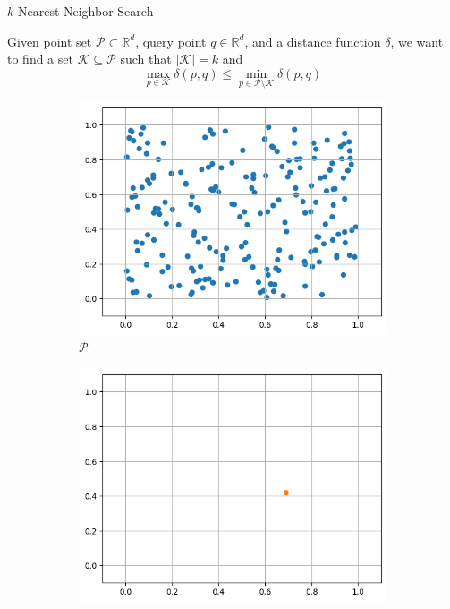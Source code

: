 \begin{frame}{\(k\)-Nearest Neighbor Search}
\begin{definition}
    Given point set \(\mathcal{P} \subset \mathbb{R}^d\), query point \(q \in \mathbb{R}^d\), and a distance function \(\delta\), we want to find a set \(\mathcal{K} \subseteq \mathcal{P}\) such that \(|\mathcal{K}| = k\) and
    \[
        \max_{p \in \mathcal{K}} \delta(p, q) \leq \min_{p \in \mathcal{P} \setminus \mathcal{K}} \delta(p, q)
    \]
    \end{definition}

    \hfill
    \begin{figure}[ht]
        \centering
        \begin{subfigure}{0.24\textwidth}
            \includegraphics[width=\textwidth]{images/sim-search-P}
            \caption*{\(\mathcal{P}\)}
        \end{subfigure}
    \hfill
        \begin{subfigure}{0.24\textwidth}
            \includegraphics[width=\textwidth]{images/sim-search-q}

\end{subfigure}
\end{figure}
\end{frame}
